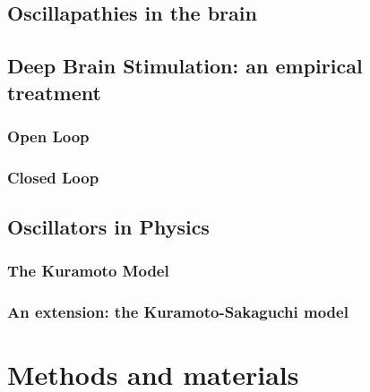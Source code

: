 \documentclass[MSc,english]{Container/thesistemplate}
\begin{document}
\newpage
\section{Oscillapathies in the brain}

\newpage
\section{Deep Brain Stimulation: an empirical treatment}
\subsection{Open Loop}
\subsection{Closed Loop}

\newpage
\section{Oscillators in Physics}
\subsection{The Kuramoto Model}
\subsection{An extension: the Kuramoto-Sakaguchi model}

\newpage
\chapter{Methods and materials}




\end{document}
